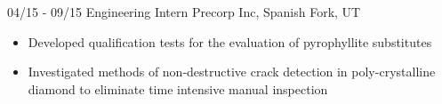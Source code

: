 \documentclass[]{friggeri-cv}
\begin{document}
\begin{entrylist}
  \entry
    {04/15 - 09/15}
    {Engineering Intern}
    {Precorp Inc, Spanish Fork, UT}
    {\vspace{-4mm}
    \begin{itemize}
        \item Developed qualification tests for the evaluation of pyrophyllite substitutes
        \item Investigated methods of non-destructive crack detection in poly-crystalline diamond to eliminate time intensive manual inspection
    \end{itemize}\vspace{1mm}}

\end{entrylist}
\end{document}
